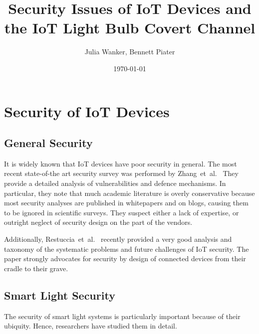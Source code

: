 \documentclass[11pt,a4paper]{article}
\begin{document}
	\title{Security Issues of IoT Devices and the IoT Light Bulb Covert Channel}
	\author{Julia Wanker, Bennett Piater}
	\date{\today}
	\maketitle
	
	\newpage 

	\section{Security of IoT Devices}%
	\label{sec:security_of_iot_devices}

	\subsection{General Security}%
	\label{sub:general_security}


    It is widely known that IoT devices have poor security in general.
	The most recent state-of-the art security survey was performed by
	Zhang~et~al.~\cite{Zhang:2017:UISTDCBWWNaWWG} %
	They provide a detailed analysis of vulnerabilities and defence mechanisms.
	In particular, they note that much academic literature is overly conservative because most security analyses are published in whitepapers and on blogs, causing them to be ignored in scientific surveys.
	They suspect either a lack of expertise, or outright neglect of security design on the part of the vendors.

	Additionally,
	Restuccia~et~al.~\cite{Restuccia:2018:SITNPaRC} %
	recently provided a very good analysis and taxonomy of the systematic problems and future challenges of IoT security. The paper strongly advocates for security by design of connected devices from their cradle to their grave.

	\subsection{Smart Light Security}%
	\label{sub:smart_light_security}
	The security of smart light systems is particularly important because of their ubiquity. Hence, researchers have studied them in detail.
\end{document}
